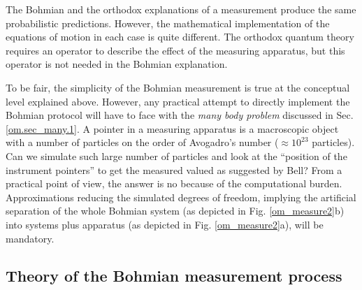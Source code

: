 \documentclass[nofootinbib, secnumarabic, amsmath, nobibnotes,10pt,aps,pra]{revtex4-1}
\newcommand{\fref}[1]{Fig. \ref{#1}}
\newcommand{\sref}[1]{Sec. \ref{#1}}
\begin{document}
The Bohmian and the orthodox explanations of a measurement produce the same probabilistic predictions. However, the mathematical implementation of the equations of motion in each case is quite different. The orthodox quantum theory requires an operator to describe the effect of the measuring apparatus, but this operator is not needed in the Bohmian explanation.

To be fair, the simplicity of the Bohmian measurement is true at the conceptual level explained above. However, any practical attempt to directly implement the Bohmian protocol will have to face with the \emph{many body problem} discussed in \sref{om.sec_many.1}. A pointer in a measuring apparatus is a macroscopic object with a number of particles on the order of  Avogadro's number ($\approx 10^{23}$ particles). Can we simulate such large number of particles and look at the ``position of the instrument pointers'' to get the measured valued as suggested by Bell? From a practical point of view, the answer is no because of the computational burden. Approximations reducing the simulated degrees of freedom, implying the artificial separation of the whole Bohmian system (as depicted in \fref{om_measure2}b) into systems plus apparatus (as depicted in \fref{om_measure2}a), will be mandatory.


\subsection{Theory of the Bohmian measurement process}
\label{om.sec_measurement.1}
\end{document}
